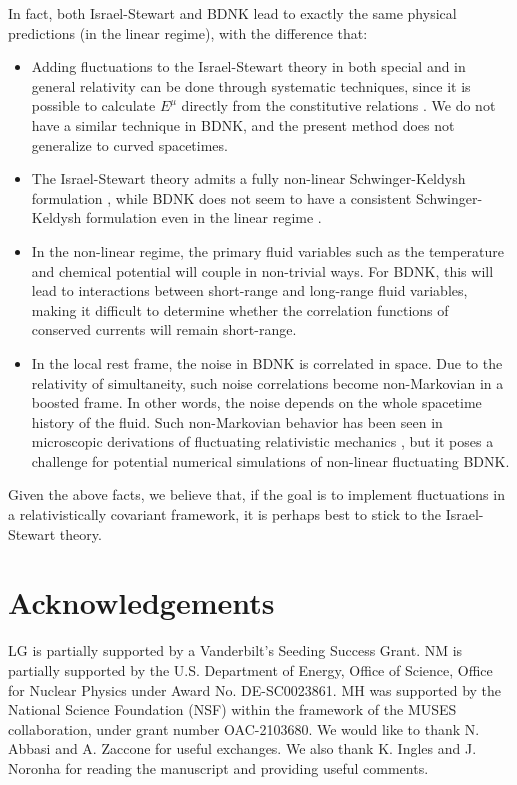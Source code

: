 \documentclass[a4paper, amsfonts, amssymb, amsmath, reprint, showkeys, nofootinbib, twoside,notitlepage,onecolumn]{revtex4-2}
\theoremstyle{definition}
\begin{document}
In fact, both Israel-Stewart and BDNK lead to exactly the same physical predictions (in the linear regime), with the difference that:
\begin{itemize}
\item Adding fluctuations to the Israel-Stewart theory in both special and in general relativity can be done through systematic techniques, since it is possible to calculate $E^\mu$ directly from the constitutive relations \cite{GavassinoGibbs2021}. We do not have a similar technique in BDNK, and the present method does not generalize to curved spacetimes.
\item The Israel-Stewart theory admits a fully non-linear Schwinger-Keldysh formulation \cite{Jain:2023obu}, while BDNK does not seem to have a consistent Schwinger-Keldysh formulation even in the linear regime \cite{Mullins:2023ott}.
\item In the non-linear regime, the primary fluid variables such as the temperature and chemical potential will couple in non-trivial ways. For BDNK, this will lead to interactions between short-range and long-range fluid variables, making it difficult to determine whether the correlation functions of conserved currents will remain short-range.
\item In the local rest frame, the noise in BDNK is correlated in space. Due to the relativity of simultaneity, such noise correlations become non-Markovian in a boosted frame. In other words, the noise depends on the whole spacetime history of the fluid. Such non-Markovian behavior has been seen in microscopic derivations of fluctuating relativistic mechanics \cite{Petrosyan:2021lqi}, but it poses a challenge for potential numerical simulations of non-linear fluctuating BDNK. 
\end{itemize}
Given the above facts, we believe that, if the goal is to implement fluctuations in a relativistically covariant framework, it is perhaps best to stick to the Israel-Stewart theory.


\section*{Acknowledgements}

LG is partially supported by a Vanderbilt's Seeding Success Grant. NM is partially supported by the U.S. Department of Energy, Office of Science, Office for Nuclear Physics
under Award No. DE-SC0023861. 
MH was supported by the National Science Foundation (NSF) within the framework of the MUSES collaboration, under grant number OAC-2103680.
We would like to thank N. Abbasi and A. Zaccone for useful exchanges. We also thank K. Ingles and J. Noronha for reading the manuscript and providing useful comments.
\end{document}
